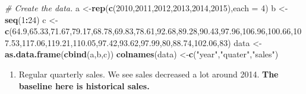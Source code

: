 \documentclass[]{book}
\newenvironment{Shaded}{\begin{snugshade}}{\end{snugshade}}
\newcommand{\KeywordTok}[1]{\textcolor[rgb]{0.13,0.29,0.53}{\textbf{#1}}}
\newcommand{\DataTypeTok}[1]{\textcolor[rgb]{0.13,0.29,0.53}{#1}}
\newcommand{\DecValTok}[1]{\textcolor[rgb]{0.00,0.00,0.81}{#1}}
\newcommand{\FloatTok}[1]{\textcolor[rgb]{0.00,0.00,0.81}{#1}}
\newcommand{\StringTok}[1]{\textcolor[rgb]{0.31,0.60,0.02}{#1}}
\newcommand{\CommentTok}[1]{\textcolor[rgb]{0.56,0.35,0.01}{\textit{#1}}}
\newcommand{\OperatorTok}[1]{\textcolor[rgb]{0.81,0.36,0.00}{\textbf{#1}}}
\newcommand{\NormalTok}[1]{#1}
\providecommand{\tightlist}{%
  \setlength{\itemsep}{0pt}\setlength{\parskip}{0pt}}
\theoremstyle{definition}
\theoremstyle{definition}
\theoremstyle{definition}
\theoremstyle{remark}
\begin{document}
\begin{Shaded}
\begin{Highlighting}[]
\CommentTok{# Create the data.}
\NormalTok{a <-}\KeywordTok{rep}\NormalTok{(}\KeywordTok{c}\NormalTok{(}\DecValTok{2010}\NormalTok{,}\DecValTok{2011}\NormalTok{,}\DecValTok{2012}\NormalTok{,}\DecValTok{2013}\NormalTok{,}\DecValTok{2014}\NormalTok{,}\DecValTok{2015}\NormalTok{),}\DataTypeTok{each =} \DecValTok{4}\NormalTok{)}
\NormalTok{b <-}\StringTok{ }\KeywordTok{seq}\NormalTok{(}\DecValTok{1}\OperatorTok{:}\DecValTok{24}\NormalTok{)}
\NormalTok{c <-}\StringTok{ }\KeywordTok{c}\NormalTok{(}\FloatTok{64.9}\NormalTok{,}\FloatTok{65.33}\NormalTok{,}\FloatTok{71.67}\NormalTok{,}\FloatTok{79.17}\NormalTok{,}\FloatTok{68.78}\NormalTok{,}\FloatTok{69.83}\NormalTok{,}\FloatTok{78.61}\NormalTok{,}\FloatTok{92.68}\NormalTok{,}\FloatTok{89.28}\NormalTok{,}\FloatTok{90.43}\NormalTok{,}\FloatTok{97.96}\NormalTok{,}\FloatTok{106.96}\NormalTok{,}\FloatTok{100.66}\NormalTok{,}\FloatTok{107.53}\NormalTok{,}\FloatTok{117.06}\NormalTok{,}\FloatTok{119.21}\NormalTok{,}\FloatTok{110.05}\NormalTok{,}\FloatTok{97.42}\NormalTok{,}\FloatTok{93.62}\NormalTok{,}\FloatTok{97.99}\NormalTok{,}\DecValTok{80}\NormalTok{,}\FloatTok{88.74}\NormalTok{,}\FloatTok{102.06}\NormalTok{,}\DecValTok{83}\NormalTok{)}
\NormalTok{data <-}\StringTok{ }\KeywordTok{as.data.frame}\NormalTok{(}\KeywordTok{cbind}\NormalTok{(a,b,c))}
\KeywordTok{colnames}\NormalTok{(data) <-}\KeywordTok{c}\NormalTok{(}\StringTok{"year"}\NormalTok{,}\StringTok{"quater"}\NormalTok{,}\StringTok{"sales"}\NormalTok{)}
\end{Highlighting}
\end{Shaded}

\begin{enumerate}
\def\labelenumi{\arabic{enumi}.}
\tightlist
\item
  Regular quarterly sales. We see sales decreased a lot around 2014.
  \textbf{The baseline here is historical sales.}
\end{enumerate}

\begin{Shaded}
\end{Shaded}
\end{document}
